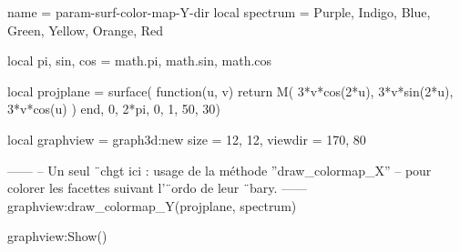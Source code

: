 \documentclass{standalone}
\begin{document}
\begin{luadraw}{name = param-surf-color-map-Y-dir}
local spectrum = {Purple, Indigo, Blue, Green, Yellow, Orange, Red}

local pi, sin, cos = math.pi, math.sin, math.cos

local projplane = surface(
  function(u, v)
    return M(
      3*v*cos(2*u),
      3*v*sin(2*u),
      3*v*cos(u)
    )
  end,
  0, 2*pi, 0, 1,
  {50, 30})

local graphview = graph3d:new{
  size    = {12, 12},
  viewdir = {170, 80}
}

------
-- Un seul ¨chgt ici : usage de la méthode ''draw_colormap_X''
-- pour colorer les facettes suivant l'¨ordo de leur ¨bary.
------
graphview:draw_colormap_Y(projplane, spectrum)

graphview:Show()
\end{luadraw}
\end{document}
